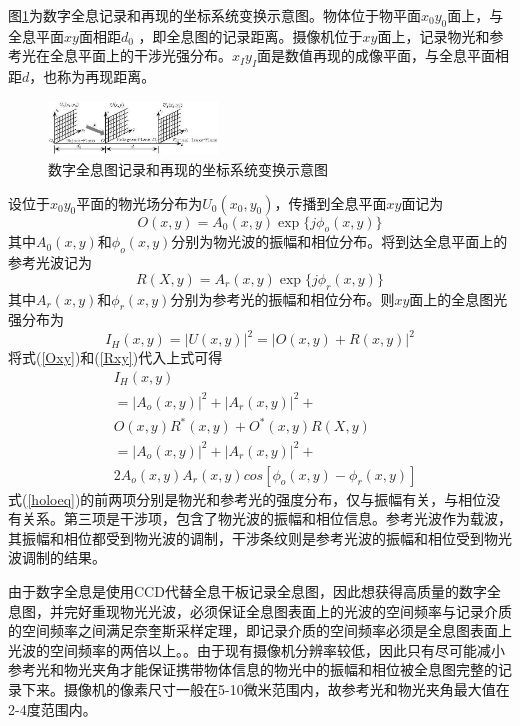 \documentclass[10pt,a4paper,twocolumn,twoside,UTF8]{ctexart}
\begin{document}
	图\ref{yuanli}为数字全息记录和再现的坐标系统变换示意图。物体位于物平面$x_0y_0$面上，与全息平面$xy$面相距$d_0$ ，即全息图的记录距离。摄像机位于$xy$面上，记录物光和参考光在全息平面上的干涉光强分布。$x_Iy_I$面是数值再现的成像平面，与全息平面相距$d$，也称为再现距离。
	\begin{figure}[H]
		\centering
		\includegraphics[width=0.4\textwidth]{img//yuanli.jpg}
		\caption{数字全息图记录和再现的坐标系统变换示意图}
		\label{yuanli}
	\end{figure}

	设位于$x_0y_0$平面的物光场分布为$U_0(x_0,y_0)$，传播到全息平面$xy$面记为
	\begin{equation}
		O(x,y)=A_0(x,y)\exp \{j\phi_o(x,y)\}
		\label{Oxy}
	\end{equation}
	其中$A_0(x,y)$和$\phi_o(x,y)$分别为物光波的振幅和相位分布。将到达全息平面上的参考光波记为
	\begin{equation}
		R(X,y)=A_r(x,y)\exp \{j\phi_r(x,y)\}
		\label{Rxy}
	\end{equation}
	其中$A_r(x,y)$和$\phi_r(x,y)$分别为参考光的振幅和相位分布。则$xy$面上的全息图光强分布为
	\begin{equation}
		I_H(x,y)=|U(x,y)|^2=|O(x,y)+R(x,y)|^2
	\end{equation}
	将式(\ref{Oxy})和(\ref{Rxy})代入上式可得
	\begin{equation}
		\begin{aligned}
		&I_H(x,y)\\ &=|A_o(x,y)|^2+|A_r(x,y)|^2+\\ &O(x,y)R^*(x,y)+O^*(x,y)R(X,y)\\ &=|A_o(x,y)|^2+|A_r(x,y)|^2+\\ &2A_o(x,y)A_r(x,y)cos[\phi_o(x,y)-\phi_r(x,y)]
		\end{aligned}
		\label{holoeq}
	\end{equation}
	式(\ref{holoeq})的前两项分别是物光和参考光的强度分布，仅与振幅有关，与相位没有关系。第三项是干涉项，包含了物光波的振幅和相位信息。参考光波作为载波，其振幅和相位都受到物光波的调制，干涉条纹则是参考光波的振幅和相位受到物光波调制的结果。

	由于数字全息是使用CCD代替全息干板记录全息图，因此想获得高质量的数字全息图，并完好重现物光光波，必须保证全息图表面上的光波的空间频率与记录介质的空间频率之间满足奈奎斯采样定理，即记录介质的空间频率必须是全息图表面上光波的空间频率的两倍以上。。由于现有摄像机分辨率较低，因此只有尽可能减小参考光和物光夹角才能保证携带物体信息的物光中的振幅和相位被全息图完整的记录下来。摄像机的像素尺寸一般在5-10微米范围内，故参考光和物光夹角最大值在2-4度范围内。
\end{document}
